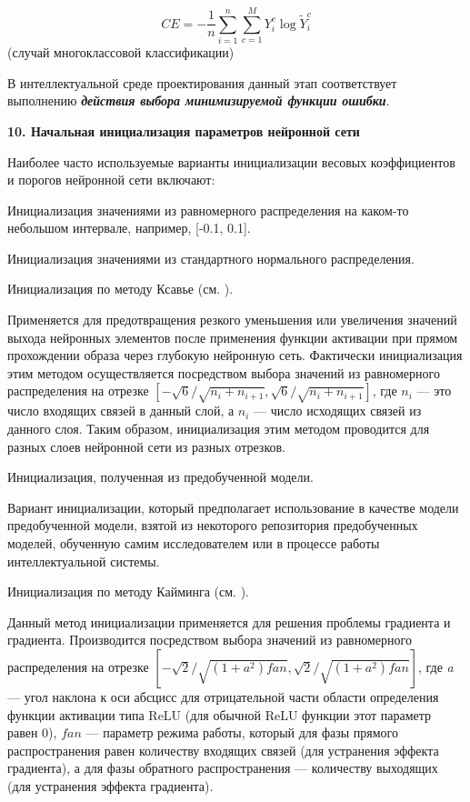 \begin{equation*}
	CE = - \frac{1}{n} \sum_{i=1}^n \sum_{c=1}^M Y_i^c \log{\widetilde{Y}_i^c}
\end{equation*}
(случай многоклассовой классификации)

В интеллектуальной среде проектирования данный этап соответствует выполнению \textbf{\textit{действия выбора минимизируемой функции ошибки}}.


\textbf{10. Начальная инициализация параметров нейронной сети}

Наиболее часто используемые варианты инициализации весовых коэффициентов и порогов нейронной сети включают:
\begin{textitemize}
	\item Инициализация значениями из равномерного распределения на каком-то небольшом интервале, например, [-0.1, 0.1].
	\item Инициализация значениями из стандартного нормального распределения.
	\item Инициализация по методу Ксавье (см. ).

	Применяется для предотвращения резкого уменьшения или увеличения значений выхода нейронных элементов после применения функции активации при прямом прохождении образа через глубокую нейронную сеть. Фактически инициализация этим методом осуществляется посредством выбора значений из равномерного распределения на отрезке $[- \sqrt{6} / \sqrt{n_i+n_{i+1}}, \sqrt{6} / \sqrt{n_i+n_{i+1}}]$, где $n_i$ --- это число входящих связей в данный слой, а $n_i$ --- число исходящих связей из данного слоя. Таким образом, инициализация этим методом проводится для разных слоев нейронной сети из разных отрезков.

	\item Инициализация, полученная из предобученной модели.

	Вариант инициализации, который предполагает использование в качестве  модели предобученной модели, взятой из некоторого репозитория предобученных моделей, обученную самим исследователем или в процессе работы интеллектуальной системы.

	\item Инициализация по методу Кайминга (см. ).

	Данный метод инициализации применяется для решения проблемы  градиента и 
	градиента. Производится посредством выбора значений из равномерного распределения на отрезке $[-\sqrt{2} / \sqrt{(1+a^2)fan}, \sqrt{2} / \sqrt{(1+a^2)fan}]$,
	где \textit{a} --- угол наклона к оси абсцисс для отрицательной части области определения функции активации типа ReLU (для обычной ReLU функции этот параметр равен 0), $fan$ --- параметр режима работы, который для фазы прямого распространения равен количеству входящих связей (для устранения эффекта  градиента), а для фазы обратного распространения --- количеству выходящих (для устранения эффекта  градиента).
\end{textitemize}

